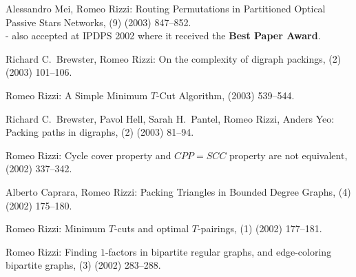 \begin{etaremune}
  \item {\sc Alessandro Mei, Romeo Rizzi:}
   \newblock  Routing Permutations in Partitioned Optical Passive Stars Networks,
   (9) (2003) 847--852.
   \newblock \\ - also accepted at IPDPS 2002 where it received the {\bf Best Paper Award}.

  \item {\sc Richard C.~Brewster, Romeo Rizzi:}
   \newblock  On the complexity of digraph packings,
   (2) (2003) 101--106.

  \item {\sc Romeo Rizzi:}
   \newblock  A Simple Minimum $T$-Cut Algorithm,
    (2003) 539--544.

  \item {\sc Richard C.~Brewster, Pavol Hell, Sarah H.~Pantel, Romeo Rizzi, Anders Yeo:}
   \newblock  Packing paths in digraphs,
   (2) (2003) 81--94.

  \item {\sc Romeo Rizzi:}
   \newblock  Cycle cover property and $CPP=SCC$ property are not equivalent,
    (2002) 337--342.

  \item {\sc Alberto Caprara, Romeo Rizzi:}
   \newblock  Packing Triangles in Bounded Degree Graphs,
   (4) (2002) 175--180.

  \item {\sc Romeo Rizzi:}
   \newblock  Minimum $T$-cuts and optimal $T$-pairings,
   (1) (2002) 177--181.

  \item {\sc Romeo Rizzi:}
   \newblock  Finding $1$-factors in bipartite regular graphs,
              and edge-coloring bipartite graphs,
   (3) (2002) 283--288. 


\end{etaremune}
